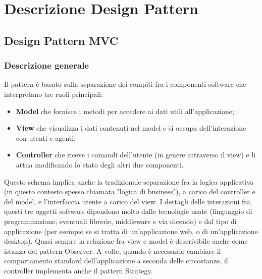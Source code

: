%
%




\section{Descrizione Design Pattern} %
\label{sec:descdp}
	\subsection{Design Pattern MVC} %
	\label{sub:Descrizione}
		\subsubsection{Descrizione generale} %
		Il pattern è basato sulla separazione dei compiti fra i componenti software che interpretano tre ruoli principali:
		\begin{itemize}
		\item \textbf{Model} che fornisce i metodi per accedere ai dati utili all'applicazione;
		\item \textbf{View} che visualizza i dati contenuti nel model e si occupa dell'interazione con utenti e agenti;
		\item \textbf{Controller} che riceve i comandi dell'utente (in genere attraverso il view) e li attua modificando lo stato degli altri due componenti.
		\end{itemize}
		Questo schema implica anche la tradizionale separazione fra la logica applicativa (in questo contesto spesso chiamata "logica di business"), a carico del controller e del model, e l'interfaccia utente a carico del view.
		I dettagli delle interazioni fra questi tre oggetti software dipendono molto dalle tecnologie usate (linguaggio di programmazione, eventuali librerie, middleware e via dicendo) e dal tipo di applicazione (per esempio se si tratta di un'applicazione web, o di un'applicazione desktop). Quasi sempre la relazione fra view e model è descrivibile anche come istanza del pattern Observer. A volte, quando è necessario cambiare il comportamento standard dell'applicazione a seconda delle circostanze, il controller implementa anche il pattern Strategy.
		
